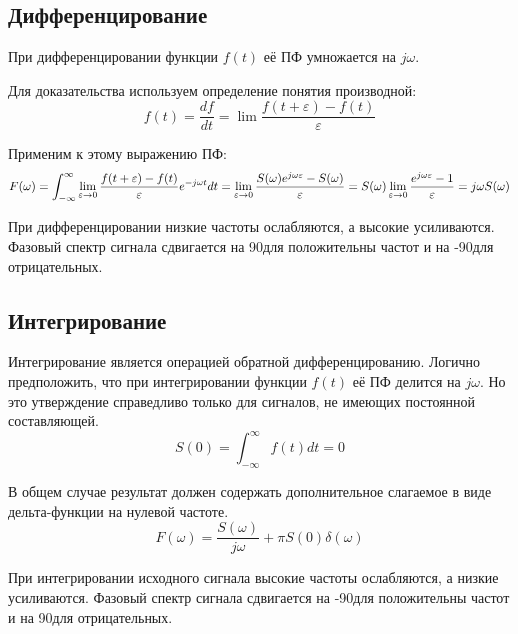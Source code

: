 \documentclass[a4paper,12pt]{report}
\begin{document}
\subsection{Дифференцирование}
    При дифференцировании функции $f(t)$ её ПФ умножается на $j\omega$.
    
    Для доказательства используем определение понятия производной:
\begin{equation}
       f(t) = \frac{df}{dt} = \lim \frac{f(t+\varepsilon)-f(t)}{\varepsilon}
\end{equation}    

    Применим к этому выражению ПФ:
\begin{equation}
       F(\omega) = \int_{-\infty}^{\infty} \lim_{\varepsilon\to\\0} \frac{f(t+\varepsilon)-f(t)}{\varepsilon} e^{-j \omega t} dt = \lim_{\varepsilon\to\\0} \frac{S(\omega)e^{j \omega \varepsilon} - S(\omega)}{\varepsilon} = S(\omega)\lim_{\varepsilon\to\\0} \frac{e^{j \omega \varepsilon} - 1}{\varepsilon} = j \omega S(\omega)
\end{equation} 

    При дифференцировании низкие частоты ослабляются, а высокие усиливаются. Фазовый спектр сигнала сдвигается на 90\degree для положительны частот и на -90\degree для отрицательных.    
     
\subsection{Интегрирование}
    Интегрирование является операцией обратной дифференцированию. Логично предположить, что при интегрировании функции $f(t)$ её ПФ делится на $j\omega$. Но это утверждение справедливо только для сигналов, не имеющих постоянной составляющей.
\begin{equation}
       S(0) = \int_{-\infty}^{\infty} f(t) dt = 0
\end{equation}     

    В общем случае результат должен содержать дополнительное слагаемое в виде дельта-функции на нулевой частоте.
\begin{equation}
       F(\omega) = \frac{S(\omega)}{j\omega}+\pi S(0) \delta(\omega)
\end{equation}

    При интегрировании исходного сигнала высокие частоты ослабляются, а низкие усиливаются. Фазовый спектр сигнала сдвигается на -90\degree для положительны частот и на 90\degree для отрицательных. 
\end{document}
